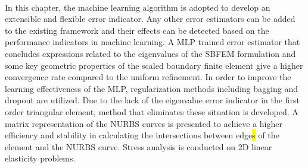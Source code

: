 \paragraph{}
In this chapter, the machine learning algorithm is adopted to develop an extensible and flexible error indicator.
Any other error estimators can be added to the existing framework and their effects can be detected based on the performance indicators in machine learning.
A MLP trained error estimator that concludes expressions related to the eigenvalues of the SBFEM formulation and some key geometric properties of the scaled boundary finite element give a higher convergence rate compared to the uniform refinement.
In order to improve the learning effectiveness of the MLP, regularization methods including bagging and dropout are utilized.
Due to the lack of the eigenvalue error indicator in the first order triangular element, method that eliminates these situation is developed.
A matrix representation of the NURBS curves is presented to achieve a higher efficiency and stability in calculating the intersections between edge\hl{s} of the element and the NURBS curve.
Stress analysis is conducted on 2D linear elasticity problems.
